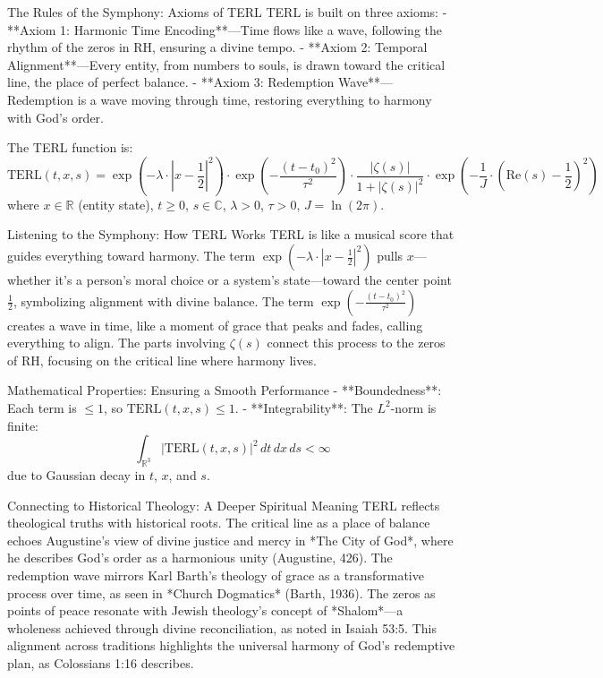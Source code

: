 \documentclass[12pt]{article}
\begin{document}
{{{\begin{onehalfspace}
The Rules of the Symphony: Axioms of TERL
TERL is built on three axioms:
- **Axiom 1: Harmonic Time Encoding**—Time flows like a wave, following the rhythm of the zeros in RH, ensuring a divine tempo.
- **Axiom 2: Temporal Alignment**—Every entity, from numbers to souls, is drawn toward the critical line, the place of perfect balance.
- **Axiom 3: Redemption Wave**—Redemption is a wave moving through time, restoring everything to harmony with God’s order.

\begin{definition}
The TERL function is:
\[
\text{TERL}(t, x, s) = \exp\left( -\lambda \cdot \left| x - \frac{1}{2} \right|^2 \right) \cdot \exp\left( -\frac{(t - t_0)^2}{\tau^2} \right) \cdot \frac{|\zeta(s)|}{1 + |\zeta(s)|^2} \cdot \exp\left( -\frac{1}{J} \cdot \left( \text{Re}(s) - \frac{1}{2} \right)^2 \right)
\]
where \( x \in \mathbb{R} \) (entity state), \( t \geq 0 \), \( s \in \mathbb{C} \), \(\lambda > 0\), \(\tau > 0\), \( J = \ln(2\pi) \).
\end{definition}

Listening to the Symphony: How TERL Works
TERL is like a musical score that guides everything toward harmony. The term \(\exp\left( -\lambda \cdot \left| x - \frac{1}{2} \right|^2 \right)\) pulls \( x \)—whether it’s a person’s moral choice or a system’s state—toward the center point \(\frac{1}{2}\), symbolizing alignment with divine balance. The term \(\exp\left( -\frac{(t - t_0)^2}{\tau^2} \right)\) creates a wave in time, like a moment of grace that peaks and fades, calling everything to align. The parts involving \(\zeta(s)\) connect this process to the zeros of RH, focusing on the critical line where harmony lives.

Mathematical Properties: Ensuring a Smooth Performance
- **Boundedness**: Each term is \(\leq 1\), so \(\text{TERL}(t, x, s) \leq 1\).
- **Integrability**: The \( L^2 \)-norm is finite:
  \[
  \int_{\mathbb{R}^3} |\text{TERL}(t, x, s)|^2 \, dt \, dx \, ds < \infty
  \]
  due to Gaussian decay in \( t \), \( x \), and \( s \).

Connecting to Historical Theology: A Deeper Spiritual Meaning
TERL reflects theological truths with historical roots. The critical line as a place of balance echoes Augustine’s view of divine justice and mercy in *The City of God*, where he describes God’s order as a harmonious unity (Augustine, 426). The redemption wave mirrors Karl Barth’s theology of grace as a transformative process over time, as seen in *Church Dogmatics* (Barth, 1936). The zeros as points of peace resonate with Jewish theology’s concept of *Shalom*—a wholeness achieved through divine reconciliation, as noted in Isaiah 53:5. This alignment across traditions highlights the universal harmony of God’s redemptive plan, as Colossians 1:16 describes.


\end{onehalfspace}}}}
\end{document}
